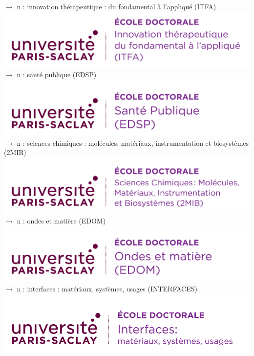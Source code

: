 \documentclass[french,12pt,a4paper]{book}
\begin{document}
\noindent \textbf{\color{Prune}$\rightarrow$} n : innovation thérapeutique : du fondamental à l'appliqué (ITFA)\\    \includegraphics[scale=.7]{logo_usp_ITFA.png}\\

\noindent \textbf{\color{Prune}$\rightarrow$} n : santé publique (EDSP)\\
\includegraphics[scale=.7]{logo_usp_EDSP.png}\\

\noindent \textbf{\color{Prune}$\rightarrow$} n : sciences chimiques : molécules, matériaux, instrumentation et biosystèmes (2MIB)\\
\includegraphics[scale=.7]{logo_usp_2MIB.png}\\

\noindent \textbf{\color{Prune}$\rightarrow$} n : ondes et matière (EDOM)\\
\includegraphics[scale=.7]{logo_usp_EDOM.png}\\
\newpage
\noindent \textbf{\color{Prune}$\rightarrow$} n : interfaces : matériaux, systèmes, usages (INTERFACES)\\
\includegraphics[scale=.535]{logo_usp_INTERFACES.png}\\
\end{document}
